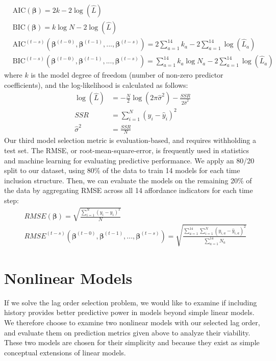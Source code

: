 \documentclass[master]{subfiles}
\begin{document}
\begin{align*}
&\text{AIC}(\boldsymbol\beta) = 2k - 2\log(\hat{L})\\
&\text{BIC}(\boldsymbol\beta) = k\log N - 2\log(\hat{L})\\
&\text{AIC}^{(t-s)}(\boldsymbol\beta^{(t-0)}, \boldsymbol\beta^{(t-1)}, ..., \boldsymbol\beta^{(t-s)}) = 2\sum_{a=1}^{14}k_a - 2\sum_{a=1}^{14}\log(\hat{L}_a)\\
&\text{BIC}^{(t-s)}(\boldsymbol\beta^{(t-0)}, \boldsymbol\beta^{(t-1)}, ..., \boldsymbol\beta^{(t-s)}) = \sum_{a=1}^{14}k_a\log N_a - 2\sum_{a=1}^{14}\log(\hat{L}_a)
\end{align*}
where $k$ is the model degree of freedom (number of non-zero predictor coefficients), and the log-likelihood is calculated as follows:
\begin{align*}
\log(\hat{L}) &= -\frac{N}{2}\log(2\pi\hat{\sigma}^2) - \frac{SSR}{2\hat{\sigma}^2}\\
SSR &= \sum_{i=1}^N(y_i - \hat{y}_i)^2\\
\hat{\sigma}^2 &= \frac{SSR}{N}
\end{align*}
Our third model selection metric is evaluation-based, and requires withholding a test set.  The RMSE, or root-mean-square-error, is frequently used in statistics and machine learning for evaluating predictive performance.  We apply an 80/20 split to our dataset, using 80\% of the data to train 14 models for each time inclusion structure.  Then, we can evaluate the models on the remaining 20\% of the data by aggregating RMSE across all 14 affordance indicators for each time step:
\begin{align*}
&RMSE(\boldsymbol\beta) = \sqrt{\frac{\sum_{i=1}^N(y_i - \hat{y}_i)^2}{N}}\\
&RMSE^{(t-s)}(\boldsymbol\beta^{(t-0)}, \boldsymbol\beta^{(t-1)}, ..., \boldsymbol\beta^{(t-s)}) = \sqrt{\frac{\sum_{a=1}^{14}\sum_{i=1}^N(y_{i, a} - \hat{y}_{i, a})^2}{\sum_{a=1}^{14}N_a}}
\end{align*}
\clearpage
\section{Nonlinear Models}\label{sec:nonlinear}
If we solve the lag order selection problem, we would like to examine if including history provides better predictive power in models beyond simple linear models.  We therefore choose to examine two nonlinear models with our selected lag order, and evaluate them on prediction metrics given above to analyze their viability.  These two models are chosen for their simplicity and because they exist as simple conceptual extensions of linear models.
\end{document}
